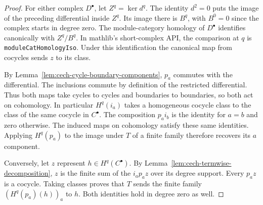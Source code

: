 \begin{proof}
\leanok
For either complex $D^\bullet$, let $Z^q=\ker d^q$. The identity $d^2=0$
puts the image of the preceding differential inside $Z^q$. Its image
there is $B^q$, with $B^0=0$ since the complex starts in degree zero.
The module-category homology of $D^\bullet$ identifies canonically with
$Z^q/B^q$. In mathlib's short-complex API, the comparison at $q$ is
\texttt{moduleCatHomologyIso}. Under this
identification the canonical map from cocycles sends $z$ to its class.

By Lemma~\ref{lem:cech-cycle-boundary-components}, $p_a$ commutes with the
differential. The inclusions commute by definition of the restricted
differential. Thus both maps take cycles to cycles and boundaries to
boundaries, so both act on cohomology. In particular $H^q(i_a)$ takes a
homogeneous cocycle class to the class of the same cocycle in $C^\bullet$.
The composition $p_ai_b$ is the identity for $a=b$ and zero otherwise.
The induced maps on cohomology satisfy these same identities. Applying
$H^q(p_a)$ to the image under $T$ of a finite family therefore recovers
its $a$ component.

Conversely, let $z$ represent $h\in H^q(C^\bullet)$. By
Lemma~\ref{lem:cech-termwise-decomposition}, $z$ is the finite sum of the
$i_a p_a z$ over its degree support. Every $p_a z$ is a cocycle.
Taking classes proves that $T$ sends the finite family
$(H^q(p_a)(h))_a$ to $h$. Both identities hold in degree zero as well.
\end{proof}

